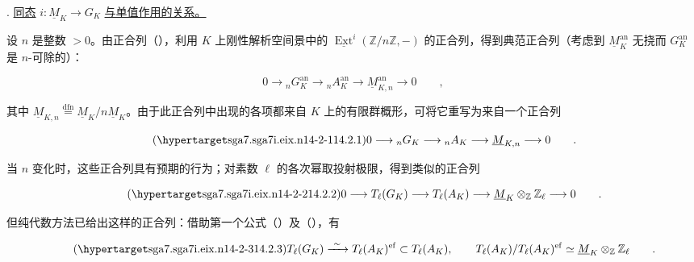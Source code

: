 \par\medskip
\noindent
{}. \underline{同态}
$i:\underline M_K\longrightarrow G_K$ \underline{与单值作用的关系。}

设 $n$ 是整数 $>0$。由正合列（），利用 $K$ 上刚性解析空间景中的 $\underline{\operatorname{Ext}}^i(\mathbb Z/n\mathbb Z,-)$ 的正合列，得到典范正合列（考虑到 $\underline M_K^{\mathrm{an}}$ 无挠而 $G_K^{\mathrm{an}}$ 是 $n$-可除的）：

\begin{equation*}
 0\longrightarrow{}_nG_K^{\mathrm{an}}
 \longrightarrow{}_nA_K^{\mathrm{an}}
 \longrightarrow\underline M_{K,n}^{\mathrm{an}}
 \longrightarrow0\qquad ,
\end{equation*}

\noindent
其中 $\underline M_{K,n}\overset{\mathrm{dfn}}{=}\underline M_K/n\underline M_K$。由于此正合列中出现的各项都来自 $K$ 上的有限群概形，可将它重写为来自一个正合列

\begin{equation}\tag{\SGARefTarget{sga7.sga7i.eix.n14-2-1}{14.2.1}}
 0\longrightarrow{}_nG_K\longrightarrow{}_nA_K
 \longrightarrow\underline M_{K,n}\longrightarrow0\qquad .
\end{equation}

\noindent
当 $n$ 变化时，这些正合列具有预期的行为；对素数 $\ell$ 的各次幂取投射极限，得到类似的正合列

\begin{equation}\tag{\SGARefTarget{sga7.sga7i.eix.n14-2-2}{14.2.2}}
 0\longrightarrow T_\ell(G_K)\longrightarrow T_\ell(A_K)
 \longrightarrow\underline M_K\otimes_{\mathbb Z}\mathbb Z_\ell
 \longrightarrow0\qquad .
\end{equation}

\noindent
但纯代数方法已给出这样的正合列：借助第一个公式（）及（），有

\begin{equation}\tag{\SGARefTarget{sga7.sga7i.eix.n14-2-3}{14.2.3}}
 T_\ell(G_K)\xrightarrow{\ \sim\ }T_\ell(A_K)^{\mathrm{ef}}
 \subset T_\ell(A_K),\qquad
 T_\ell(A_K)/T_\ell(A_K)^{\mathrm{ef}}
 \simeq\underline M_K\otimes_{\mathbb Z}\mathbb Z_\ell\qquad .
\end{equation}

